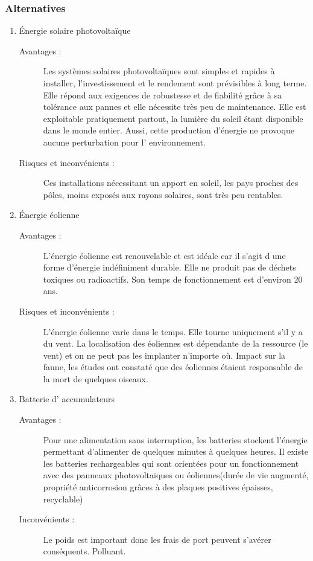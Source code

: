 \subsubsection{Alternatives}
\begin{enumerate}
\item Énergie solaire photovolta\"ique
\begin{description}
\item [Avantages : ]
Les syst\`emes solaires photovoltaïques sont simples et rapides à installer, l'investissement  et le rendement sont pr\'{e}visibles à long terme.
Elle r\'{e}pond aux exigences de robustesse et de fiabilit\'{e} grâce à sa tolérance aux pannes et elle n\'{e}cessite tr\`es peu de maintenance. 
Elle est exploitable pratiquement partout, la lumi\`ere du soleil \'{e}tant disponible dans le monde entier. %
Aussi, cette production d'\'{e}nergie ne provoque aucune perturbation pour l' environnement.

\item [Risques et inconv\'enients : ]
Ces installations n\'{e}cessitant un apport en soleil, les pays proches des pôles, moins expos\'{e}s aux rayons solaires, sont tr\`es peu rentables.
\end{description}

\item Énergie \'{e}olienne
\begin{description}
\item [Avantages : ]
L'\'{e}nergie \'{e}olienne est renouvelable et est id\'{e}ale car il s'agit d une forme d'\'{e}nergie ind\'{e}finiment durable.
Elle ne produit pas de d\'{e}chets toxiques ou radioactifs. 
Son temps de fonctionnement est d'environ 20 ans.

\item [Risques et inconv\'{e}nients : ]
L'\'{e}nergie \'{e}olienne varie dans le temps.  Elle tourne uniquement s'il y a du vent.
La localisation des \'{e}oliennes est d\'{e}pendante de la ressource (le vent) et on ne peut pas les implanter n'importe où. 
Impact sur la faune, les \'{e}tudes ont constat\'{e} que des \'{e}oliennes \'{e}taient responsable de la mort de quelques oiseaux.
\end{description}


\item Batterie d' accumulateurs
\begin{description}
\item [Avantages : ]
Pour une alimentation sans interruption, les batteries stockent l'énergie permettant d'alimenter de quelques minutes à quelques heures.
Il existe les batteries rechargeables qui sont orient\'{e}es pour un fonctionnement avec des panneaux photovoltaïques ou  \'{e}oliennes(dur\'{e}e de vie augment\'{e}, propriét\'{e} anticorrosion grâces à des plaques positives \'{e}paisses, recyclable)

\item [Inconv\'{e}nients : ]
Le poids est important donc les frais de port peuvent s'av\'{e}rer cons\'{e}quents.
Polluant.

\end{description}
\end{enumerate}

